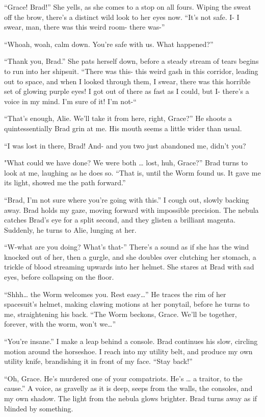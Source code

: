 “Grace! Brad!” She yells, as she comes to a stop on all fours. Wiping the sweat off the brow, there’s a distinct wild look to her eyes now. “It’s not safe. I- I swear, man, there was this weird room- there was-” 

“Whoah, woah, calm down. You’re safe with us. What happened?”  

“Thank you, Brad.” She pats herself down, before a steady stream of tears begins to run into her shipsuit. “There was this- this weird gash in this corridor, leading out to space, and when I looked through them, I swear, there was this horrible set of glowing purple eyes! I got out of there as fast as I could, but I- there’s a voice in my mind. I’m sure of it! I’m not-“  

“That’s enough, Alie. We’ll take it from here, right, Grace?” He shoots a quintessentially Brad grin at me. His mouth seems a little wider than usual.  

“I was lost in there, Brad! And- and you two just abandoned me, didn’t you?  

"What could we have done? We were both … lost, huh, Grace?” Brad turns to look at me, laughing as he does so. “That is, until the Worm found us. It gave me its light, showed me the path forward.”  

“Brad, I’m not sure where you’re going with this.” I cough out, slowly backing away. Brad holds my gaze, moving forward with impossible precision. The nebula catches Brad’s eye for a split second, and they glisten a brilliant magenta. Suddenly, he turns to Alie, lunging at her.   

“W-what are you doing? What’s that-”  There’s a sound as if she has the wind knocked out of her, then a gurgle, and she doubles over clutching her stomach, a trickle of blood streaming upwards into her helmet. She stares at Brad with sad eyes, before collapsing on the floor.  

“Shhh… the Worm welcomes you. Rest easy…” He traces the rim of her spacesuit’s helmet, making clawing motions at her ponytail, before he turns to me, straightening his back. “The Worm beckons, Grace. We’ll be together, forever, with the worm, won’t we…”  

“You’re insane.” I make a leap behind a console. Brad continues his slow, circling motion around the horseshoe. I reach into my utility belt, and produce my own utility knife, brandishing it in front of my face. “Stay back!”  

“Oh, Grace. He’s murdered one of your compatriots. He’s … a traitor, to the cause.” A voice, as gravelly as it is deep, seeps from the walls, the consoles, and my own shadow. The light from the nebula glows brighter. Brad turns away as if blinded by something.  

